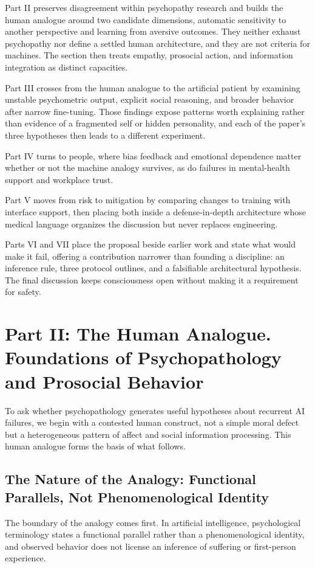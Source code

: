 \documentclass{article}
\begin{document}
Part II preserves disagreement within psychopathy research and builds the human analogue around two candidate dimensions, automatic sensitivity to another perspective and learning from aversive outcomes. They neither exhaust psychopathy nor define a settled human architecture, and they are not criteria for machines. The section then treats empathy, prosocial action, and information integration as distinct capacities.

Part III crosses from the human analogue to the artificial patient by examining unstable psychometric output, explicit social reasoning, and broader behavior after narrow fine-tuning. Those findings expose patterns worth explaining rather than evidence of a fragmented self or hidden personality, and each of the paper's three hypotheses then leads to a different experiment.

Part IV turns to people, where bias feedback and emotional dependence matter whether or not the machine analogy survives, as do failures in mental-health support and workplace trust.

Part V moves from risk to mitigation by comparing changes to training with interface support, then placing both inside a defense-in-depth architecture whose medical language organizes the discussion but never replaces engineering.

Parts VI and VII place the proposal beside earlier work and state what would make it fail, offering a contribution narrower than founding a discipline: an inference rule, three protocol outlines, and a falsifiable architectural hypothesis. The final discussion keeps consciousness open without making it a requirement for safety.
\section{Part II: The Human Analogue. Foundations of Psychopathology and Prosocial Behavior}
To ask whether psychopathology generates useful hypotheses about recurrent AI failures, we begin with a contested human construct, not a simple moral defect but a heterogeneous pattern of affect and social information processing. This human analogue forms the basis of what follows.
\subsection{The Nature of the Analogy: Functional Parallels, Not Phenomenological Identity}\label{sec:analogy-boundary}
The boundary of the analogy comes first. In artificial intelligence, psychological terminology states a functional parallel rather than a phenomenological identity, and observed behavior does not license an inference of suffering or first-person experience.
\end{document}

